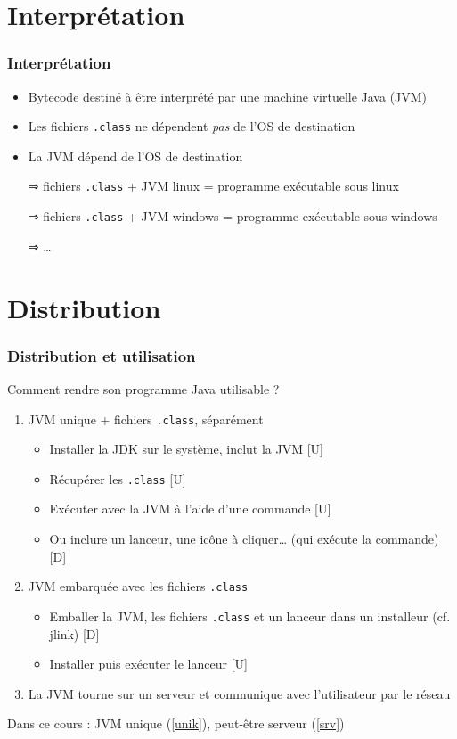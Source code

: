 \documentclass[english, french]{beamer}
\begin{document}
\section{Interprétation}
\begin{frame}
	\frametitle{Interprétation}
	\begin{itemize}
		\item Bytecode destiné à être interprété par une machine virtuelle Java (JVM)
		\item Les fichiers \texttt{.class} ne dépendent \emph{pas} de l’OS de destination
		\item La JVM dépend de l’OS de destination
		\item[⇒] fichiers \texttt{.class} + JVM linux = programme exécutable sous linux
		\item[⇒] fichiers \texttt{.class} + JVM windows = programme exécutable sous windows
		\item[⇒] …
	\end{itemize}
\end{frame}

\section{Distribution}
\begin{frame}
	\frametitle{Distribution et utilisation}
	Comment rendre son programme Java utilisable ?
	\begin{enumerate}
		\item \label{unik} JVM unique + fichiers \texttt{.class}, séparément
		\begin{itemize}
			\item Installer la JDK sur le système, inclut la JVM [U]
			\item Récupérer les \texttt{.class} [U]
			\item Exécuter avec la JVM à l’aide d’une commande [U]
			\item Ou inclure un lanceur, une icône à cliquer… (qui exécute la commande) [D]
		\end{itemize}
		\item JVM embarquée avec les fichiers \texttt{.class}
		\begin{itemize}
			\item Emballer la JVM, les fichiers \texttt{.class} et un lanceur dans un installeur (cf. jlink) [D]
			\item Installer puis exécuter le lanceur [U]
		\end{itemize}
		\item \label{srv} La JVM tourne sur un serveur et communique avec l’utilisateur par le réseau
	\end{enumerate}
	Dans ce cours : JVM unique (\cref{unik}), peut-être serveur (\cref{srv})
\end{frame}
\end{document}
